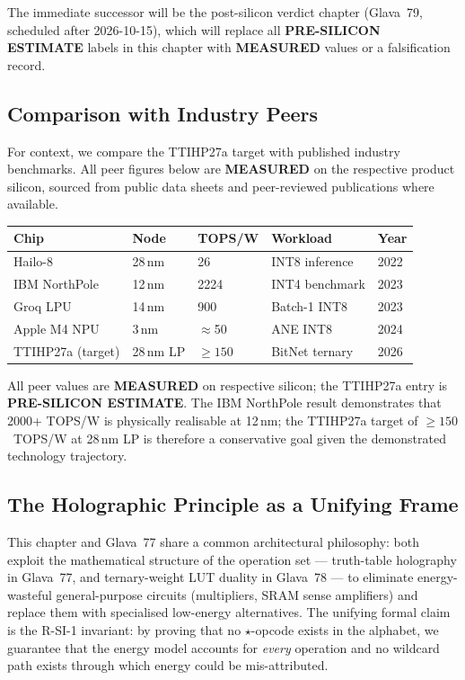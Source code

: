 The immediate successor will be the post-silicon verdict chapter
(Glava~79, scheduled after 2026-10-15), which will replace all
\textbf{PRE-SILICON ESTIMATE} labels in this chapter with
\textbf{MEASURED} values or a falsification record.

\subsection{Comparison with Industry Peers}

For context, we compare the TTIHP27a target with published industry
benchmarks.  All peer figures below are \textbf{MEASURED} on the respective
product silicon, sourced from public data sheets and peer-reviewed publications
where available.

\begin{center}
\begin{tabular}{lllll}
\toprule
Chip & Node & TOPS/W & Workload & Year \\
\midrule
Hailo-8           & 28\,nm  & 26     & INT8 inference  & 2022 \\
IBM NorthPole     & 12\,nm  & 2224   & INT4 benchmark  & 2023 \\
Groq LPU          & 14\,nm  & 900    & Batch-1 INT8    & 2023 \\
Apple M4 NPU      & 3\,nm   & \(\approx\)50 & ANE INT8 & 2024 \\
TTIHP27a (target) & 28\,nm LP & \(\geq 150\) & BitNet ternary & 2026 \\
\bottomrule
\end{tabular}
\end{center}

All peer values are \textbf{MEASURED} on respective silicon; the TTIHP27a
entry is \textbf{PRE-SILICON ESTIMATE}.  The IBM NorthPole result
\cite{ibm_northpole_2023} demonstrates that 2000+ TOPS/W is physically
realisable at 12\,nm; the TTIHP27a target of \(\geq 150\)~TOPS/W at 28\,nm
LP is therefore a conservative goal given the demonstrated technology
trajectory.

\subsection{The Holographic Principle as a Unifying Frame}

This chapter and Glava~77 share a common architectural philosophy: both exploit
the mathematical structure of the operation set --- truth-table holography in
Glava~77, and ternary-weight LUT duality in Glava~78 --- to eliminate
energy-wasteful general-purpose circuits (multipliers, SRAM sense amplifiers)
and replace them with specialised low-energy alternatives.  The unifying
formal claim is the R-SI-1 invariant: by proving that no \(\star\)-opcode
exists in the alphabet, we guarantee that the energy model accounts for
\emph{every} operation and no wildcard path exists through which energy
could be mis-attributed.

